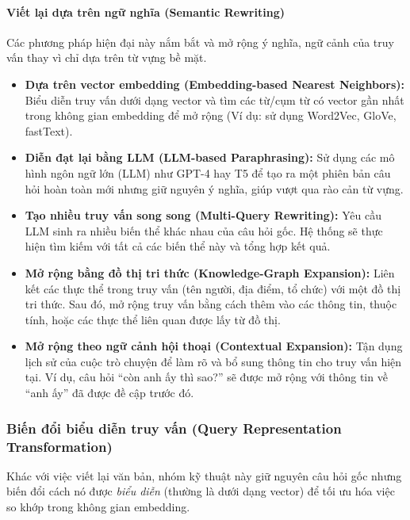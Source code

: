 \paragraph{Viết lại dựa trên ngữ nghĩa (Semantic Rewriting)}
Các phương pháp hiện đại này nắm bắt và mở rộng ý nghĩa, ngữ cảnh của truy vấn thay vì chỉ dựa trên từ vựng bề mặt.
\begin{itemize}
	\item \textbf{Dựa trên vector embedding (Embedding-based Nearest Neighbors):} Biểu diễn truy vấn dưới dạng vector và tìm các từ/cụm từ có vector gần nhất trong không gian embedding để mở rộng (Ví dụ: sử dụng Word2Vec, GloVe, fastText).
	\item \textbf{Diễn đạt lại bằng LLM (LLM-based Paraphrasing):} Sử dụng các mô hình ngôn ngữ lớn (LLM) như GPT-4 hay T5 để tạo ra một phiên bản câu hỏi hoàn toàn mới nhưng giữ nguyên ý nghĩa, giúp vượt qua rào cản từ vựng.
	\item \textbf{Tạo nhiều truy vấn song song (Multi-Query Rewriting):} Yêu cầu LLM sinh ra nhiều biến thể khác nhau của câu hỏi gốc. Hệ thống sẽ thực hiện tìm kiếm với tất cả các biến thể này và tổng hợp kết quả.
	\item \textbf{Mở rộng bằng đồ thị tri thức (Knowledge-Graph Expansion):} Liên kết các thực thể trong truy vấn (tên người, địa điểm, tổ chức) với một đồ thị tri thức. Sau đó, mở rộng truy vấn bằng cách thêm vào các thông tin, thuộc tính, hoặc các thực thể liên quan được lấy từ đồ thị.
	\item \textbf{Mở rộng theo ngữ cảnh hội thoại (Contextual Expansion):} Tận dụng lịch sử của cuộc trò chuyện để làm rõ và bổ sung thông tin cho truy vấn hiện tại. Ví dụ, câu hỏi “còn anh ấy thì sao?” sẽ được mở rộng với thông tin về “anh ấy” đã được đề cập trước đó.
\end{itemize}


\subsubsection{Biến đổi biểu diễn truy vấn (Query Representation Transformation)}
\label{sssec:query_representation_transform}
Khác với việc viết lại văn bản, nhóm kỹ thuật này giữ nguyên câu hỏi gốc nhưng biến đổi cách nó được \textit{biểu diễn} (thường là dưới dạng vector) để tối ưu hóa việc so khớp trong không gian embedding.

